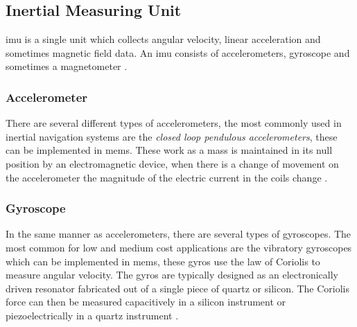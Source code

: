 \subsection{Inertial Measuring Unit}
\acrfull{imu} is a single unit which collects angular velocity, linear acceleration and sometimes magnetic field data. An \acrshort{imu} consists of accelerometers, gyroscope and sometimes a magnetometer \cite{vik}. 

\subsubsection{Accelerometer}
There are several different types of accelerometers, the most commonly used in inertial navigation systems are the \textit{closed loop pendulous accelerometers}, these can be implemented in \acrfull{mems}. These work as a mass is maintained in its null position by an electromagnetic device, when there is a change of movement on the accelerometer the magnitude of the electric current in the coils change \cite{vik}.

\subsubsection{Gyroscope}
In the same manner as accelerometers, there are several types of gyroscopes. The most common for low and medium cost applications are the vibratory gyroscopes which can be implemented in \acrshort{mems}, these gyros use the law of Coriolis to measure angular velocity. The gyros are typically designed as an electronically driven resonator fabricated out of a single piece of quartz or silicon. The Coriolis force can then be measured capacitively in a silicon instrument or piezoelectrically in a quartz instrument \cite{vik}.
\newpage
